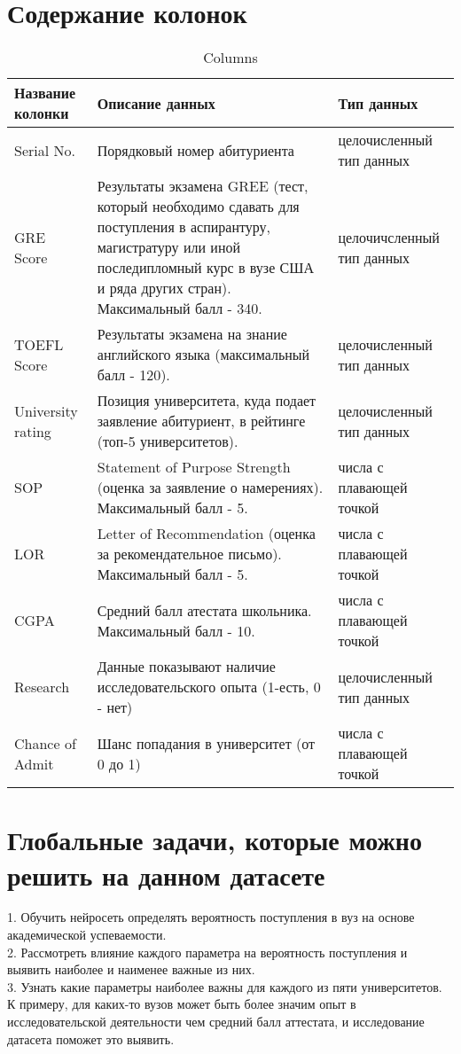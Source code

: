 \documentclass[12pt,a4paper]{article}
\begin{document}
	\section{Содержание колонок}
	\begin{table}[h]
		\caption{Columns}
		
		\begin{tabular}{|p{4cm}|p{8cm}|p{4cm}|}
			\hline Название колонки & Описание данных & Тип данных \\ \hline
			Serial No. & Порядковый номер абитуриента & целочисленный тип данных \\ \hline
			GRE Score & Результаты экзамена GREE (тест, который необходимо сдавать для поступления в аспирантуру, магистратуру или иной последипломный курс в вузе США и ряда других стран). Максимальный балл - 340. & целочичсленный тип данных \\ \hline
			TOEFL Score & Результаты экзамена на знание английского языка (максимальный балл - 120). & целочисленный тип данных \\ \hline
			University rating & Позиция университета, куда подает заявление абитуриент, в рейтинге (топ-5 университетов). & целочисленный тип данных \\ \hline
			SOP & Statement of Purpose Strength (оценка за заявление о намерениях). Максимальный балл - 5. & числа с плавающей точкой\\ \hline
			LOR & Letter of Recommendation (оценка за рекомендательное письмо). Максимальный балл - 5. & числа с плавающей точкой\\ \hline
			CGPA & Средний балл атестата школьника. Максимальный балл - 10. & числа с плавающей точкой \\ \hline
			Research & Данные показывают наличие исследовательского опыта (1-есть, 0 - нет) & целочисленный тип данных \\ \hline
			Chance of Admit & Шанс попадания в университет (от 0 до 1) & числа с плавающей точкой \\ \hline
			
			
		\end{tabular} 
	\end{table}
	
	\section{Глобальные задачи, которые можно решить на данном датасете}
	1. Обучить нейросеть определять вероятность поступления в вуз на основе академической успеваемости.  \\
	
	2. Рассмотреть влияние каждого параметра на вероятность поступления и выявить наиболее и наименее важные из них. \\
	
	3. Узнать какие параметры наиболее важны для каждого из пяти университетов. К примеру, для каких-то вузов может быть более значим опыт в исследовательской деятельности чем средний балл аттестата, и исследование датасета поможет это выявить.
	
	
\end{document}
